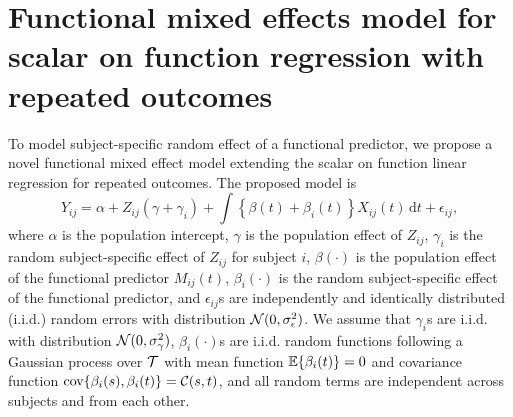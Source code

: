 \section{Functional mixed effects model for scalar on function regression with repeated outcomes}
To model subject-specific random effect of a functional predictor,
 we propose a novel functional mixed effect model extending
 the scalar on function linear regression for repeated outcomes. 
 The proposed model is
\begin{equation}
\label{eq:model}
Y_{ij} = \alpha + Z_{ij} (\gamma + \gamma_i)  + \int \left \{\beta(t) + \beta_i(t)\right\} X_{ij}(t) \, \mathrm{d}t + \epsilon_{ij},
\end{equation}
where $\alpha$ is the population intercept, $\gamma$ is the population effect of $Z_{ij}$, 
$\gamma_i$ is the random subject-specific effect of $Z_{ij}$ for subject $i$,
$\beta(\cdot)$ is the population effect of the functional predictor $M_{ij}(t)$, 
$\beta_i(\cdot)$ is the random subject-specific effect of the functional predictor,
and $\epsilon_{ij}$s are independently  and identically distributed (i.i.d.) random errors with distribution $\mathcal{N}(0,\sigma_{\epsilon}^2)$.
We assume that $\gamma_i$s are i.i.d. with distribution $\mathcal{N}(0,\sigma^2_\gamma)$, $\beta_i(\cdot)$s are i.i.d. random functions following a Gaussian process over $\mathcal{T}$ with mean function $\mathbb{E}\{\beta_i(t)\} = 0$ and covariance function $\text{cov}\{\beta_i(s),\beta_i(t)\} = \mathcal{C}(s,t)$, and all random terms are independent across subjects and from each other. 

